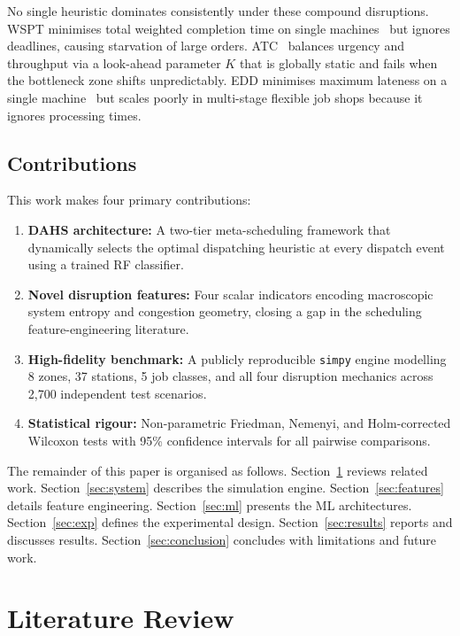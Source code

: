 \documentclass[3p,times]{elsarticle}
\begin{document}
No single heuristic dominates consistently under these
compound disruptions.  WSPT minimises total weighted completion
time on single machines~\cite{Smith1956} but ignores deadlines,
causing starvation of large orders.  ATC~\cite{Vepsalainen1987}
balances urgency and throughput via a look-ahead parameter $K$
that is globally static and fails when the bottleneck zone shifts
unpredictably.  EDD minimises maximum lateness on a single
machine~\cite{Moore1968} but scales poorly in multi-stage flexible
job shops because it ignores processing times.

\subsection{Contributions}
\label{sec:contrib}

This work makes four primary contributions:

\begin{enumerate}
  \item \textbf{DAHS architecture:} A two-tier meta-scheduling
    framework that dynamically selects the optimal dispatching
    heuristic at every dispatch event using a trained RF
    classifier.
  \item \textbf{Novel disruption features:} Four scalar indicators
    encoding macroscopic system entropy and congestion geometry,
    closing a gap in the scheduling feature-engineering literature.
  \item \textbf{High-fidelity benchmark:} A publicly reproducible
    \texttt{simpy} engine modelling 8 zones, 37 stations, 5 job
    classes, and all four disruption mechanics across 2{,}700
    independent test scenarios.
  \item \textbf{Statistical rigour:} Non-parametric Friedman,
    Nemenyi, and Holm-corrected Wilcoxon tests with 95\%
    confidence intervals for all pairwise comparisons.
\end{enumerate}

The remainder of this paper is organised as follows.
Section~\ref{sec:lit} reviews related work.
Section~\ref{sec:system} describes the simulation engine.
Section~\ref{sec:features} details feature engineering.
Section~\ref{sec:ml} presents the ML architectures.
Section~\ref{sec:exp} defines the experimental design.
Section~\ref{sec:results} reports and discusses results.
Section~\ref{sec:conclusion} concludes with limitations and
future work.

\section{Literature Review}
\label{sec:lit}
\end{document}
